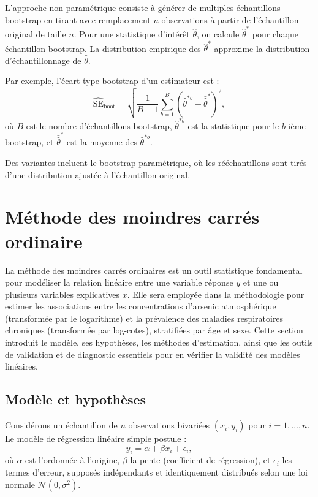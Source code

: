 L'approche non paramétrique consiste à générer de multiples échantillons bootstrap en tirant avec remplacement $n$ observations à partir de l'échantillon original de taille $n$. Pour une statistique d'intérêt $\hat{\theta}$, on calcule $\hat{\theta}^*$ pour chaque échantillon bootstrap. La distribution empirique des $\hat{\theta}^*$ approxime la distribution d'échantillonnage de $\hat{\theta}$.

Par exemple, l'écart-type bootstrap d'un estimateur est :
\begin{equation}
	\widehat{\mathrm{SE}}_{\mathrm{boot}} = \sqrt{\frac{1}{B-1} \sum_{b=1}^B (\hat{\theta}^{*b} - \bar{\hat{\theta}}^*)^2},
\end{equation}
où $B$ est le nombre d'échantillons bootstrap, $\hat{\theta}^{*b}$ est la statistique pour le $b$-ième bootstrap, et $\bar{\hat{\theta}}^*$ est la moyenne des $\hat{\theta}^{*b}$.

Des variantes incluent le bootstrap paramétrique, où les rééchantillons sont tirés d'une distribution ajustée à l'échantillon original.

\section{Méthode des moindres carrés ordinaire}

La méthode des moindres carrés ordinaires est un outil statistique fondamental pour modéliser la relation linéaire entre une variable réponse $y$ et une ou plusieurs variables explicatives $x$. Elle sera employée dans la méthodologie pour estimer les associations entre les concentrations d'arsenic atmosphérique (transformée par le logarithme) et la prévalence des maladies respiratoires chroniques (transformée par log-cotes), stratifiées par âge et sexe. Cette section introduit le modèle, ses hypothèses, les méthodes d'estimation, ainsi que les outils de validation et de diagnostic essentiels pour en vérifier la validité des modèles linéaires.

\subsection{Modèle et hypothèses}
Considérons un échantillon de $n$ observations bivariées $(x_i, y_i)$ pour $i = 1, \dots, n$. Le modèle de régression linéaire simple postule :
\begin{equation}
	y_i = \alpha + \beta x_i + \epsilon_i,
\end{equation}
où $\alpha$ est l'ordonnée à l'origine, $\beta$ la pente (coefficient de régression), et $\epsilon_i$ les termes d'erreur, supposés indépendants et identiquement distribués selon une loi normale $\mathcal{N}(0, \sigma^2)$.

